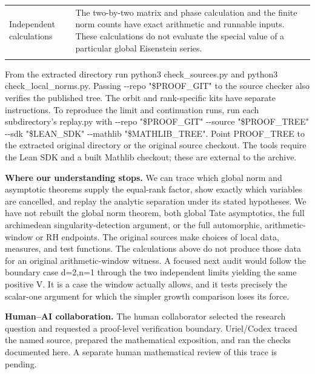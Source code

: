 \documentclass[11pt,letterpaper]{article}
\begin{document}
{\begin{longtable}{@{}>{\raggedright\arraybackslash}p{0.22\dimexpr\linewidth-2\tabcolsep\relax}>{\raggedright\arraybackslash}p{0.78\dimexpr\linewidth-2\tabcolsep\relax}@{}}
Independent calculations & The two-by-two matrix and phase calculation and the finite norm counts have exact arithmetic and runnable inputs. These calculations do not evaluate the special value of a particular global Eisenstein series.\\\addlinespace[4pt]
\bottomrule\end{longtable}}
From the extracted directory run {\ttfamily\small python3 check\_\allowbreak{}sources.\allowbreak{}py} and {\ttfamily\small python3 check\_\allowbreak{}local\_\allowbreak{}norms.\allowbreak{}py}. Passing {\ttfamily\small -\allowbreak{}-\allowbreak{}repo "\$PROOF\_\allowbreak{}GIT"} to the source checker also verifies the published tree. The orbit and rank-specific kits have separate instructions. To reproduce the limit and continuation runs, run each subdirectory’s {\ttfamily\small replay.\allowbreak{}py} with {\ttfamily\small -\allowbreak{}-\allowbreak{}repo "\$PROOF\_\allowbreak{}GIT" -\allowbreak{}-\allowbreak{}source "\$PROOF\_\allowbreak{}TREE" -\allowbreak{}-\allowbreak{}sdk "\$LEAN\_\allowbreak{}SDK" -\allowbreak{}-\allowbreak{}mathlib "\$MATHLIB\_\allowbreak{}TREE"}. Point PROOF\_TREE to the extracted {\ttfamily\small original} directory or the original source checkout. The tools require the Lean SDK and a built Mathlib checkout; these are external to the archive.

\textbf{Where our understanding stops.} We can trace which global norm and asymptotic theorems supply the equal-rank factor, show exactly which variables are cancelled, and replay the analytic separation under its stated hypotheses. We have not rebuilt the global norm theorem, both global Tate asymptotics, the full archimedean singularity-detection argument, or the full automorphic, arithmetic-window or RH endpoints. The original sources make choices of local data, measures, and test functions. The calculations above do not produce those data for an original arithmetic-window witness. A focused next audit would follow the boundary case d=2,n=1 through the two independent limits yielding the same positive V. It is a case the window actually allows, and it tests precisely the scalar-one argument for which the simpler growth comparison loses its force.

\textbf{Human–AI collaboration.} The human collaborator selected the research question and requested a proof-level verification boundary. Uriel/Codex traced the named source, prepared the mathematical exposition, and ran the checks documented here. A separate human mathematical review of this trace is pending.
\end{document}
